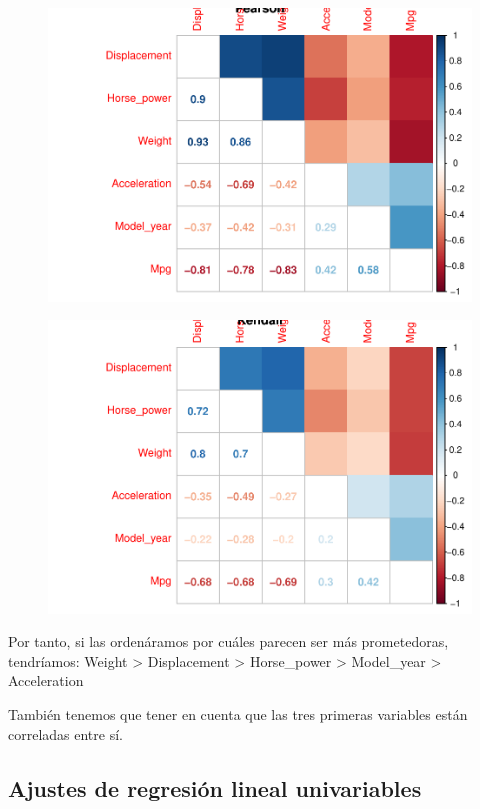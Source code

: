 \begin{figure}[H]\includegraphics[width=.9\linewidth]{img/Regresion_files/figure-latex/unnamed-chunk-3-1} \caption{}\end{figure}

\begin{figure}[H]\includegraphics[width=.9\linewidth]{img/Regresion_files/figure-latex/unnamed-chunk-3-2} \caption{}\end{figure}

Por tanto, si las ordenáramos por cuáles parecen ser más prometedoras, tendríamos: Weight \textgreater{} Displacement \textgreater{} Horse\_power \textgreater{} Model\_year \textgreater{} Acceleration

También tenemos que tener en cuenta que las tres primeras variables están correladas entre sí.

\subsection{Ajustes de regresión lineal univariables}

